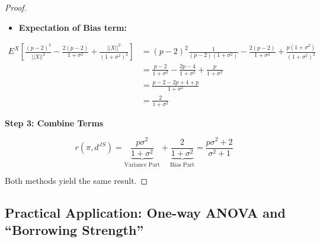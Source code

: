 \documentclass[
  letterpaper,
  DIV=11,
  numbers=noendperiod]{scrreprt}
\providecommand{\tightlist}{%
  \setlength{\itemsep}{0pt}\setlength{\parskip}{0pt}}
\renewcommand{\[}{\begin{equation}}
\renewcommand{\]}{\end{equation}}
\theoremstyle{definition}
\theoremstyle{plain}
\theoremstyle{plain}
\theoremstyle{plain}
\theoremstyle{definition}
\theoremstyle{plain}
\theoremstyle{remark}
\begin{document}
\begin{proof}
\begin{itemize}
  \begin{itemize}
  \tightlist
  \item
    \textbf{Expectation of Bias term:}
  \end{itemize}

  \[
  \begin{aligned}
  E^X \left[ \frac{(p-2)^2}{||X||^2} - \frac{2(p-2)}{1+\sigma^2} + \frac{||X||^2}{(1+\sigma^2)^2} \right] &= (p-2)^2 \frac{1}{(p-2)(1+\sigma^2)} - \frac{2(p-2)}{1+\sigma^2} + \frac{p(1+\sigma^2)}{(1+\sigma^2)^2} \\
  &= \frac{p-2}{1+\sigma^2} - \frac{2p-4}{1+\sigma^2} + \frac{p}{1+\sigma^2} \\
  &= \frac{p - 2 - 2p + 4 + p}{1+\sigma^2} \\
  &= \frac{2}{1+\sigma^2}
  \end{aligned}
  \]
\end{itemize}

\textbf{Step 3: Combine Terms}

\[
r(\pi, d^{JS}) = \underbrace{\frac{p\sigma^2}{1+\sigma^2}}_{\text{Variance Part}} + \underbrace{\frac{2}{1+\sigma^2}}_{\text{Bias Part}} = \frac{p\sigma^2 + 2}{\sigma^2 + 1}
\]

Both methods yield the same result.

\end{proof}

\subsection{Practical Application: One-way ANOVA and ``Borrowing
Strength''}\label{practical-application-one-way-anova-and-borrowing-strength}
\end{document}
